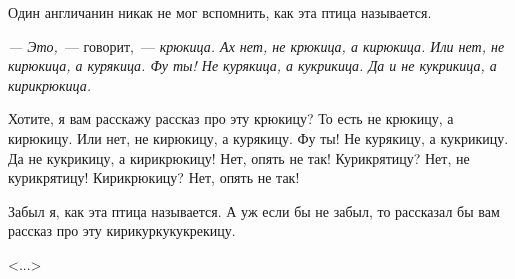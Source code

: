 Один англичанин никак не мог вспомнить, как эта птица называется.

\textit{--- Это,}~--- говорит,~--- \textit{крюкица. Ах нет, не крюкица, а кирюкица. Или нет, не кирюкица, а курякица. Фу ты! Не курякица, а кукрикица. Да и не кукрикица, а кирикрюкица.}

Хотите, я вам расскажу рассказ про эту крюкицу? То есть не крюкицу, а кирюкицу. Или нет, не кирюкицу, а курякицу. Фу ты! Не курякицу, а кукрикицу. Да не кукрикицу, а кирикрюкицу! Нет, опять не так! Курикрятицу? Нет, не курикрятицу! Кирикрюкицу? Нет, опять не так!

Забыл я, как эта птица называется. А уж если бы не забыл, то рассказал бы вам рассказ про эту кирикуркукукрекицу.

\medskip
\begin{flushright}
<...>
\end{flushright}


